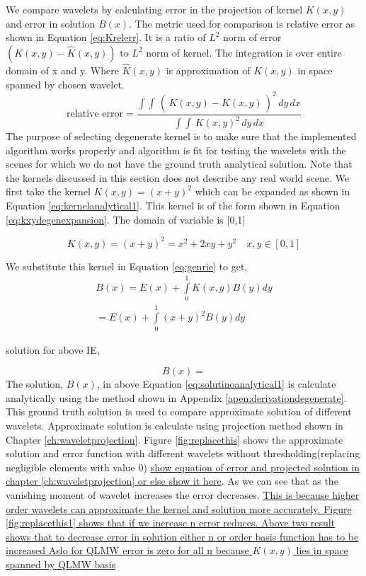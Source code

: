 We compare wavelets by calculating error in the projection of kernel $K(x,y)$ and error in solution $B(x)$. The metric used for comparison is relative error as shown in Equation \ref{eq:Krelerr}. It is a ratio of $L^2$ norm of error $(K(x,y)-\hat{K}(x,y))$ to $L^2$ norm of kernel. The integration is over entire domain of x and y. Where $\hat{K}(x,y)$ is approximation of $K(x,y)$ in space spanned by chosen wavelet.
\begin{equation} \label{eq:Krelerr}
\text{relative  error}=\frac{\int\int \,(\,K(x,y)-\hat{K}(x,y)\,)^2  \,dy \, dx}{\int\int \,K(x,y)^2  \,dy \, dx}
\end{equation}
The purpose of selecting degenerate kernel is to make sure that the implemented algorithm works properly and algorithm is fit for testing the wavelets with the scenes for which we do not have the ground truth analytical solution. Note that the kernels discussed in this section does not describe any real world scene. We first take the kernel $K(x,y)=(x+y)^2$ which can be expanded as shown in Equation \ref{eq:kernelanalytical1}. This kernel is of the form shown in Equation \ref{eq:kxydegenexpansion}. The domain of variable is [0,1]




\begin{equation} \label{eq:kernelanalytical1}
K(x,y)=(x+y)^2=x^2+2xy+y^2 \quad x,y \in [0,1]
\end{equation}



We substitute this kernel in Equation \ref{eq:genrie} to get,
\begin{eqnarray} \label{eq:analytical1}
B(x)=E(x)+\int\limits_0^1 K(x,y)B(y) dy \\
 = E(x)+\int\limits_0^1 (x+y)^2 B(y) dy
\end{eqnarray}

solution for above IE,

\begin{equation} \label{eq:solutinoanalytical1}
B(x)=
\end{equation}
The solution, $B(x)$, in above Equation \ref{eq:solutinoanalytical1} is calculate analytically using the method shown in Appendix \ref{apen:derivationdegenerate}. This ground truth solution is used to compare approximate solution of different wavelets. Approximate solution is calculate using projection method shown in Chapter \ref{ch:waveletprojection}. Figure \ref{fig:replacethis} shows the approximate solution and error function with different wavelets without thresholding(replacing negligible elements  with value 0) \underline {show equation of error and projected solution in chapter \ref{ch:waveletprojection} or else show it here}. As we can see that as the vanishing moment of wavelet increases the error decreases. \underline{ This is because higher order wavelets can approximate the kernel and solution more accurately. Figure \ref{fig:replacethis1}  shows that if we increase n error reduces. Above two result shows that to decrease error in  solution either n or order basis function has to be increased Aslo for QLMW error is zero for all n because $K(x,y)$ lies in space spanned by QLMW basis}



